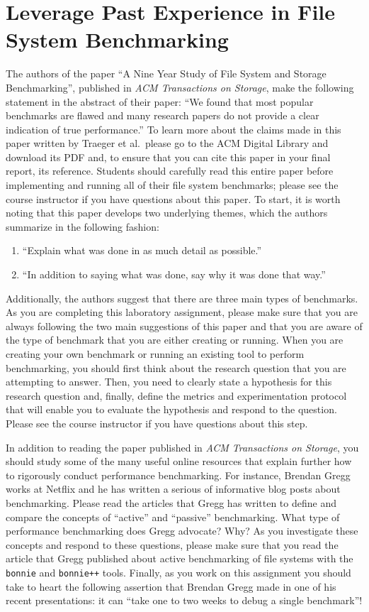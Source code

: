 \section*{Leverage Past Experience in File System Benchmarking}

The authors of the paper ``A Nine Year Study of File System and Storage Benchmarking'', published in {\em ACM
Transactions on Storage}, make the following statement in the abstract of their paper: ``We found that most popular
benchmarks are flawed and many research papers do not provide a clear indication of true performance.'' To learn more
about the claims made in this paper written by Traeger et al.\ please go to the ACM Digital Library and download its PDF
and, to ensure that you can cite this paper in your final report, its  reference. Students should
carefully read this entire paper before implementing and running all of their file system benchmarks; please see the
course instructor if you have questions about this paper. To start, it is worth noting that this paper develops two
underlying themes, which the authors summarize in the following fashion:

\begin{enumerate}
  \itemsep 0in
  \item ``Explain what was done in as much detail as possible.''
  \item ``In addition to saying what was done, say why it was done that way.''
\end{enumerate}

Additionally, the authors suggest that there are three main types of benchmarks. As you are completing this laboratory
assignment, please make sure that you are always following the two main suggestions of this paper and that you are aware
of the type of benchmark that you are either creating or running. When you are creating your own benchmark or running an
existing tool to perform benchmarking, you should first think about the research question that you are attempting to
answer. Then, you need to clearly state a hypothesis for this research question and, finally, define the
metrics and experimentation protocol that will enable you to evaluate the hypothesis and respond to the question. Please
see the course instructor if you have questions about this step.

In addition to reading the paper published in {\em ACM Transactions on Storage}, you should study some of the many
useful online resources that explain further how to rigorously conduct performance benchmarking. For instance, Brendan
Gregg works at Netflix and he has written a serious of informative blog posts about benchmarking. Please read the
articles that Gregg has written to define and compare the concepts of ``active'' and ``passive'' benchmarking. What type
of performance benchmarking does Gregg advocate? Why? As you investigate these concepts and respond to these questions,
please make sure that you read the article that Gregg published about active benchmarking of file systems with the {\tt
  bonnie} and {\tt bonnie++} tools. Finally, as you work on this assignment you should take to heart the following
  assertion that Brendan Gregg made in one of his recent presentations: it can ``take one to two weeks to debug a single
  benchmark''!

